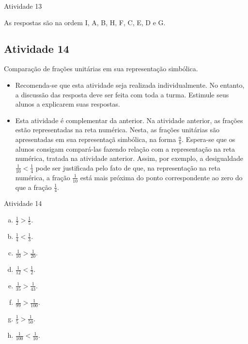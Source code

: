 \documentclass[oneside]{book}
\begin{document}
\begin{multicols}{2}
\begin{itemize}
  \end{itemize}
  

\begin{resposta*}{Atividade 13}

As respostas são na ordem I, A, B, H, F, C, E, D e G. 

\end{resposta*}

\subsection{Atividade 14}

  Comparação de frações unitárias em sua representação simbólica.

\begin{itemize}
 \item  Recomenda-se que esta atividade seja realizada individualmente. No entanto, a discussão das resposta deve ser feita com toda a turma. Estimule seus alunos a explicarem suas respostas.
 \item  Esta atividade é complementar da anterior. Na atividade anterior, as frações estão representadas na reta numérica. Nesta, as frações unitárias são apresentadas em sua representaçã simbólica, na forma $\frac{a}{b}$. Espera-se que os alunos consigam compará-las fazendo relação com a representação na reta numérica, tratada na atividade anterior. Assim, por exemplo, a desigualdade $\frac{1}{10} < \frac{1}{4}$ pode ser justificada pelo fato de que, na representação na reta numérica, a fração $\frac{1}{10}$ está mais próxima do ponto correspondente ao zero do que a fração $\frac{1}{4}$. 
\end{itemize}

\begin{resposta*}{Atividade 14}
\begin{enumerate}[a)]
 \item $\frac{1}{2}>\frac{1}{5}$.
\item $\frac{1}{4}<\frac{1}{3}$.  
\item $\frac{1}{10}>\frac{1}{20}$. 
\item $\frac{1}{12}<\frac{1}{2}$.
\item $\frac{1}{35}>\frac{1}{43}$.
\item  $\frac{1}{99}>\frac{1}{100}$.
\item  $\frac{1}{5}>\frac{1}{50}$.
\item  $\frac{1}{100}<\frac{1}{10}$.
\end{enumerate}
 

\end{resposta*}
\end{multicols}
\end{document}
